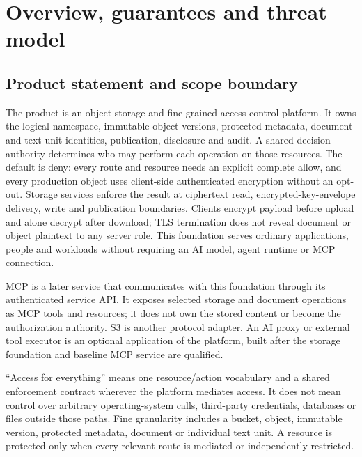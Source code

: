 \documentclass[11pt,a4paper]{article}
\begin{document}
\clearpage{}

\setcounter{section}{-1}


\section{Overview, guarantees and threat model}\label{sec:overview}
\subsection{Product statement and scope boundary}
The product is an object-storage and fine-grained access-control platform. It owns the logical namespace, immutable object versions, protected metadata, document and text-unit identities, publication, disclosure and audit. A shared decision authority determines who may perform each operation on those resources. The default is deny: every route and resource needs an explicit complete allow, and every production object uses client-side authenticated encryption without an opt-out. Storage services enforce the result at ciphertext read, encrypted-key-envelope delivery, write and publication boundaries. Clients encrypt payload before upload and alone decrypt after download; TLS termination does not reveal document or object plaintext to any server role. This foundation serves ordinary applications, people and workloads without requiring an AI model, agent runtime or MCP connection.

MCP is a later service that communicates with this foundation through its authenticated service API. It exposes selected storage and document operations as MCP tools and resources; it does not own the stored content or become the authorization authority. S3 is another protocol adapter. An AI proxy or external tool executor is an optional application of the platform, built after the storage foundation and baseline MCP service are qualified.

``Access for everything'' means one resource/action vocabulary and a shared enforcement contract wherever the platform mediates access. It does not mean control over arbitrary operating-system calls, third-party credentials, databases or files outside those paths. Fine granularity includes a bucket, object, immutable version, protected metadata, document or individual text unit. A resource is protected only when every relevant route is mediated or independently restricted.
\end{document}
